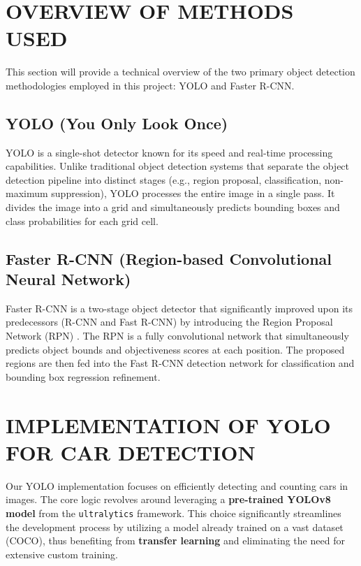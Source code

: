 \documentclass[conference]{IEEEtran}
\begin{document}
\section{\uppercase{Overview of Methods Used}}
\label{sec:methods}

This section will provide a technical overview of the two primary object detection methodologies employed in this project: YOLO and Faster R-CNN.

\subsection{YOLO (You Only Look Once)}
\label{ssec:yolo_overview} 
YOLO is a single-shot detector known for its speed and real-time processing capabilities. Unlike traditional object detection systems that separate the object detection pipeline into distinct stages (e.g., region proposal, classification, non-maximum suppression), YOLO processes the entire image in a single pass. It divides the image into a grid and simultaneously predicts bounding boxes and class probabilities for each grid cell. 

\subsection{Faster R-CNN (Region-based Convolutional Neural Network)}
\label{ssec:fastrcnn_overview} 
Faster R-CNN is a two-stage object detector that significantly improved upon its predecessors (R-CNN and Fast R-CNN) by introducing the Region Proposal Network (RPN) \cite{ren2015faster}. The RPN is a fully convolutional network that simultaneously predicts object bounds and objectiveness scores at each position. The proposed regions are then fed into the Fast R-CNN detection network for classification and bounding box regression refinement. 


\section{\uppercase{Implementation of YOLO for Car Detection}} 
\label{sec:yolo_implementation}

Our YOLO implementation focuses on efficiently detecting and counting cars in images. The core logic revolves around leveraging a \textbf{pre-trained YOLOv8 model} from the \texttt{ultralytics} framework. This choice significantly streamlines the development process by utilizing a model already trained on a vast dataset (COCO), thus benefiting from \textbf{transfer learning} and eliminating the need for extensive custom training.
\end{document}
